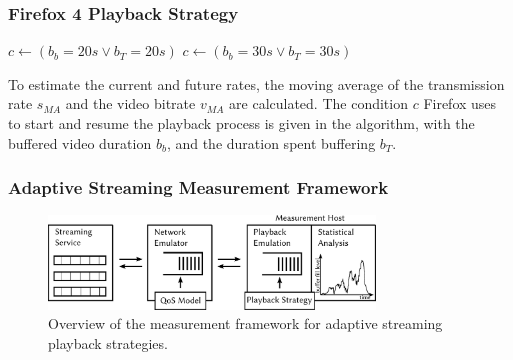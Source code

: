 \documentclass{beamer}
\begin{document}
\begin{frame}
	\frametitle{Firefox 4 Playback Strategy}

	\begin{algorithmic}
			\STATE $c \gets ( b_b=20s \lor b_T=20s )$
		\ELSE
			\STATE $c \gets ( b_b=30s \lor b_T=30s )$
		\ENDIF
	\end{algorithmic}

	To estimate the current and future rates, the moving average of the transmission rate $s_{MA}$ and the video bitrate $v_{MA}$ are calculated. The condition $c$ Firefox uses to start and resume the playback process is given in the algorithm, with the buffered video duration $b_b$, and the duration spent buffering $b_T$.
\end{frame}

\begin{frame}
	\frametitle{Adaptive Streaming Measurement Framework}

	\begin{figure}
		\centering
		\includegraphics[height=2.5cm]{../../chapters/03-streaming/images/feedback-measurement-model.pdf}
		\caption{Overview of the measurement framework for adaptive streaming playback strategies.}
	\end{figure}
\end{frame}
\end{document}

